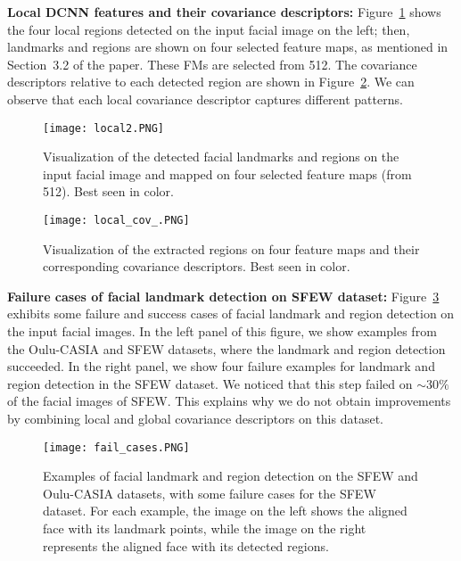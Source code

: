 \documentclass{bmvc2k}
\begin{document}
\textbf{Local DCNN features and their covariance descriptors:} Figure~\ref{fig:RegionFMs} shows the four local regions detected on the input facial image on the left; then, landmarks and regions are shown on four selected feature maps, as mentioned in Section~3.2 of the paper. These FMs are selected from 512. 
The covariance descriptors relative to each detected region are shown in Figure~\ref{fig:RegionCovs}. We can observe that each local covariance descriptor captures different patterns. 
\begin{figure}[!ht]
\centering
\texttt{[image: local2.PNG]}
\caption{Visualization of the detected facial landmarks and regions on the input facial image and mapped on four selected feature maps (from 512). Best seen in color.}
\label{fig:RegionFMs}
\end{figure}
\begin{figure}[!ht]
\centering
\texttt{[image: local\_cov\_.PNG]}
\caption{Visualization of the extracted regions on four feature maps and their corresponding covariance descriptors. Best seen in color.}
\label{fig:RegionCovs}
\end{figure}



\textbf{Failure cases of facial landmark detection on SFEW dataset:} 
Figure~\ref{fig:landfail} exhibits some failure and success cases of facial landmark and region detection on the input facial images. In the left panel of this figure, we show examples from the Oulu-CASIA and SFEW datasets, where the landmark and region detection succeeded. In the right panel, we show four failure examples for landmark and region detection in the SFEW dataset. We noticed that this step failed on $\sim30\%$ of the facial images of SFEW. This explains why we do not obtain improvements by combining local and global covariance descriptors on this dataset. 

\begin{figure}[!ht]
\centering
\texttt{[image: fail\_cases.PNG]}
\caption{Examples of facial landmark and region detection on the SFEW and Oulu-CASIA datasets, with some failure cases for the SFEW dataset. For each example, the image on the left shows the aligned face with its landmark points, while the image on the right represents the aligned face with its detected regions.}
\label{fig:landfail}
\end{figure}
\end{document}
